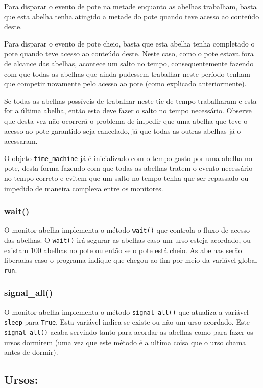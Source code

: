 \documentclass[12pt,a4paper]{article}
\begin{document}
Para disparar o evento de pote na metade enquanto as abelhas trabalham, basta que esta abelha tenha atingido a metade do pote quando teve acesso ao conteúdo deste.

Para disparar o evento de pote cheio, basta que esta abelha tenha completado o pote quando teve acesso ao conteúdo deste. Neste caso, como o pote estava fora de alcance das abelhas, acontece um salto no tempo, consequentemente fazendo com que todas as abelhas que ainda pudessem trabalhar neste período tenham que competir novamente pelo acesso ao pote (como explicado anteriormente).

Se todas as abelhas possíveis de trabalhar neste tic de tempo trabalharam e esta for a última abelha, então esta deve fazer o salto no tempo necessário. Observe que desta vez não ocorrerá o problema de impedir que uma abelha que teve o acesso ao pote garantido seja cancelado, já que todas as outras abelhas já o acessaram.

O objeto \verb+time_machine+ já é inicializado com o tempo gasto por uma abelha no pote, desta forma fazendo com que todas as abelhas tratem o evento necessário no tempo correto e evitem que um salto no tempo tenha que ser repassado ou impedido de maneira complexa entre os monitores.

\subsubsection{wait()}

O monitor abelha implementa o método \verb+wait()+ que controla o fluxo de acesso das abelhas. O \verb+wait()+ irá segurar as abelhas caso um urso esteja acordado, ou existam 100 abelhas no pote ou então se o pote está cheio. As abelhas serão liberadas caso o programa indique que chegou ao fim por meio da variável global \verb+run+.

\subsubsection{signal\_all()}

O monitor abelha implementa o método \verb+signal_all()+ que atualiza a variável \verb+sleep+ para \verb+True+. Esta variável indica se existe ou não um urso acordado. Este \verb+signal_all()+ acaba servindo tanto para acordar as abelhas como para fazer os ursos dormirem (uma vez que este método é a ultima coisa que o urso chama antes de dormir).

\subsection{Ursos:}
\end{document}

